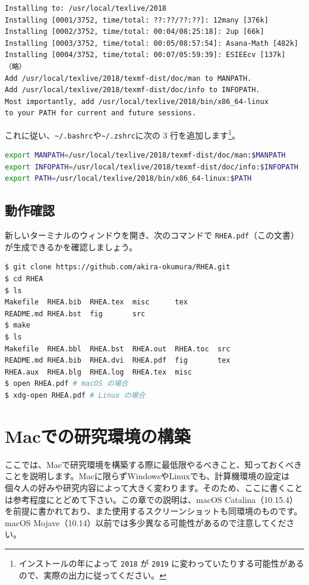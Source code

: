 \begin{lstlisting}
Installing to: /usr/local/texlive/2018
Installing [0001/3752, time/total: ??:??/??:??]: 12many [376k]
Installing [0002/3752, time/total: 00:04/08:25:18]: 2up [66k]
Installing [0003/3752, time/total: 00:05/08:57:54]: Asana-Math [482k]
Installing [0004/3752, time/total: 00:07/05:59:39]: ESIEEcv [137k]
（略）
Add /usr/local/texlive/2018/texmf-dist/doc/man to MANPATH.
Add /usr/local/texlive/2018/texmf-dist/doc/info to INFOPATH.
Most importantly, add /usr/local/texlive/2018/bin/x86_64-linux
to your PATH for current and future sessions.
\end{lstlisting}

これに従い、\texttt{\~{}/.bashrc}や\texttt{\~{}/.zshrc}に次の 3 行を追加します\footnote{インストールの年によって \texttt{2018} が \texttt{2019} に変わっていたりする可能性があるので、実際の出力に従ってください。}。

\begin{lstlisting}[language=bash]
export MANPATH=/usr/local/texlive/2018/texmf-dist/doc/man:$MANPATH
export INFOPATH=/usr/local/texlive/2018/texmf-dist/doc/info:$INFOPATH
export PATH=/usr/local/texlive/2018/bin/x86_64-linux:$PATH
\end{lstlisting}

\section{動作確認}

新しいターミナルのウィンドウを開き、次のコマンドで \texttt{RHEA.pdf}（この文書）が生成できるかを確認しましょう。

\begin{lstlisting}[language=bash]
$ git clone https://github.com/akira-okumura/RHEA.git
$ cd RHEA
$ ls
Makefile  RHEA.bib  RHEA.tex  misc      tex
README.md RHEA.bst  fig       src
$ make
$ ls
Makefile  RHEA.bbl  RHEA.bst  RHEA.out  RHEA.toc  src
README.md RHEA.bib  RHEA.dvi  RHEA.pdf  fig       tex
RHEA.aux  RHEA.blg  RHEA.log  RHEA.tex  misc
$ open RHEA.pdf # macOS の場合
$ xdg-open RHEA.pdf # Linux の場合
\end{lstlisting}

\chapter{Macでの研究環境の構築}
\label{chap:Mac}

ここでは、Macで研究環境を構築する際に最低限やるべきこと、知っておくべきことを説明します。Macに限らずWindowsやLinuxでも、計算機環境の設定は個々人の好みや研究内容によって大きく変わります。そのため、ここに書くことは参考程度にとどめて下さい。この章での説明は、macOS Catalina（10.15.4）を前提に書かれており、また使用するスクリーンショットも同環境のものです。macOS Mojave（10.14）以前では多少異なる可能性があるので注意してください。

